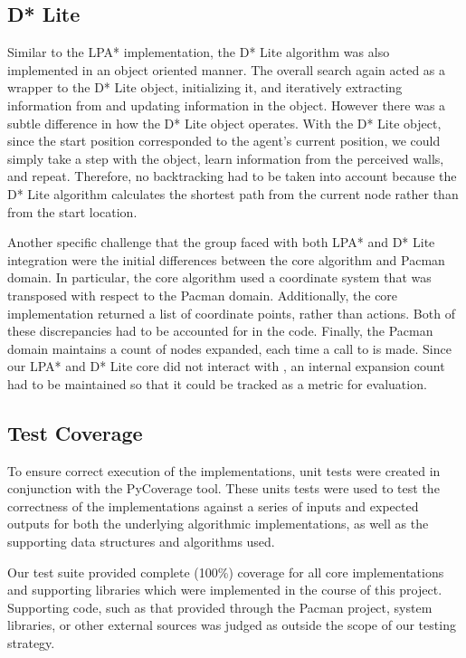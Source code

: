 \subsection{D* Lite}
	Similar to the LPA* implementation, the D* Lite algorithm was also implemented in an object oriented manner. The overall search again acted as a wrapper to the D* Lite object, initializing it, and iteratively extracting information from and updating information in the object. However there was a subtle difference in how the D* Lite object operates. With the D* Lite object, since the start position corresponded to the agent's current position, we could simply take a step with the object, learn information from the perceived walls, and repeat. Therefore, no backtracking had to be taken into account because the D* Lite algorithm calculates the shortest path from the current node rather than from the start location. 
	
	Another specific challenge that the group faced with both LPA* and D* Lite integration were the initial differences between the core algorithm and Pacman domain. In particular, the core algorithm used a coordinate system that was transposed with respect to the Pacman domain. Additionally, the core implementation returned a list of coordinate points, rather than actions. Both of these discrepancies had to be accounted for in the code. Finally, the Pacman domain maintains a count of nodes expanded, each time a call to  is made. Since our LPA* and D* Lite core did not interact with , an internal expansion count had to be maintained so that it could be tracked as a metric for evaluation.

\subsection{Test Coverage}

	To ensure correct execution of the implementations, unit tests were created in conjunction with the PyCoverage tool. These units tests were used to test the correctness of the implementations against a series of inputs and expected outputs for both the underlying algorithmic implementations, as well as the supporting data structures and algorithms used.
	
	
	Our test suite provided complete (100\%) coverage for all core implementations and supporting libraries which were implemented in the course of this project. Supporting code, such as that provided through the Pacman project, system libraries, or other external sources was judged as outside the scope of our testing strategy.


